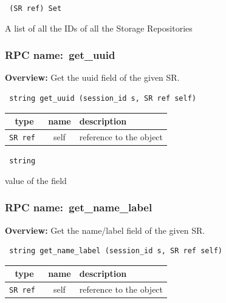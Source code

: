\vspace{0.3cm}

{\tt 
(SR ref) Set
}


A list of all the IDs of all the Storage Repositories
\vspace{0.3cm}
\vspace{0.3cm}
\vspace{0.3cm}
\subsubsection{RPC name:~get\_uuid}

{\bf Overview:} 
Get the uuid field of the given SR.

\begin{verbatim} string get_uuid (session_id s, SR ref self)\end{verbatim}



 
\vspace{0.3cm}
\begin{tabular}{|c|c|p{7cm}|}
 \hline
{\bf type} & {\bf name} & {\bf description} \\ \hline
{\tt SR ref } & self & reference to the object \\ \hline 

\end{tabular}

\vspace{0.3cm}

{\tt 
string
}


value of the field
\vspace{0.3cm}
\vspace{0.3cm}
\vspace{0.3cm}
\subsubsection{RPC name:~get\_name\_label}

{\bf Overview:} 
Get the name/label field of the given SR.

\begin{verbatim} string get_name_label (session_id s, SR ref self)\end{verbatim}



 
\vspace{0.3cm}
\begin{tabular}{|c|c|p{7cm}|}
 \hline
{\bf type} & {\bf name} & {\bf description} \\ \hline
{\tt SR ref } & self & reference to the object \\ \hline 

\end{tabular}

